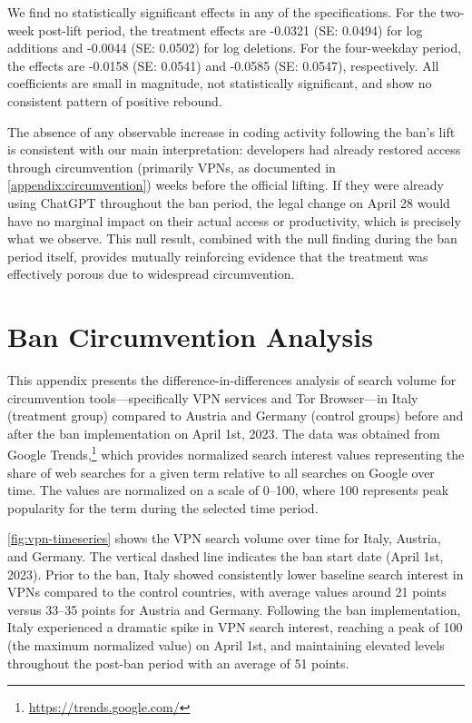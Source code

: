 We find no statistically significant effects in any of the specifications. For the two-week post-lift period, the treatment effects are -0.0321 (SE: 0.0494) for log additions and -0.0044 (SE: 0.0502) for log deletions. For the four-weekday period, the effects are -0.0158 (SE: 0.0541) and -0.0585 (SE: 0.0547), respectively. All coefficients are small in magnitude, not statistically significant, and show no consistent pattern of positive rebound. 

The absence of any observable increase in coding activity following the ban's lift is consistent with our main interpretation: developers had already restored access through circumvention (primarily VPNs, as documented in \autoref{appendix:circumvention}) weeks before the official lifting. If they were already using ChatGPT throughout the ban period, the legal change on April 28 would have no marginal impact on their actual access or productivity, which is precisely what we observe. This null result, combined with the null finding during the ban period itself, provides mutually reinforcing evidence that the treatment was effectively porous due to widespread circumvention.

\section{Ban Circumvention Analysis}
\label{appendix:circumvention}

This appendix presents the difference-in-differences analysis of search volume for circumvention tools---specifically VPN services and Tor Browser---in Italy (treatment group) compared to Austria and Germany (control groups) before and after the ban implementation on April 1st, 2023. The data was obtained from Google Trends,\footnote{\url{https://trends.google.com/}} which provides normalized search interest values representing the share of web searches for a given term relative to all searches on Google over time. The values are normalized on a scale of 0--100, where 100 represents peak popularity for the term during the selected time period.

\autoref{fig:vpn-timeseries} shows the VPN search volume over time for Italy, Austria, and Germany. The vertical dashed line indicates the ban start date (April 1st, 2023). Prior to the ban, Italy showed consistently lower baseline search interest in VPNs compared to the control countries, with average values around 21 points versus 33--35 points for Austria and Germany. Following the ban implementation, Italy experienced a dramatic spike in VPN search interest, reaching a peak of 100 (the maximum normalized value) on April 1st, and maintaining elevated levels throughout the post-ban period with an average of 51 points.


